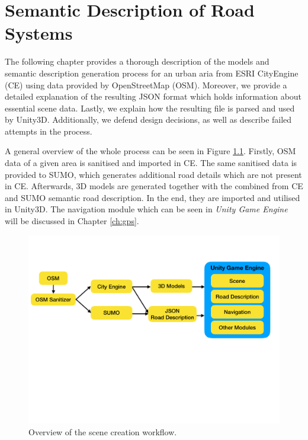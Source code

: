 \chapter{Semantic Description of Road Systems}
\label{ch:descriptionOfRoadSystems}
The following chapter provides a thorough description of the models and semantic description generation process for an urban aria from ESRI CityEngine (CE) using data provided by OpenStreetMap (OSM). Moreover, we provide a detailed explanation of the resulting JSON format which holds information about essential scene data. Lastly, we explain how the resulting file is parsed and used by Unity3D. Additionally, we defend design decisions, as well as describe failed attempts in the process.

A general overview of the whole process can be seen in Figure \ref{fig:overview}. Firstly, OSM data of a given area is sanitised and imported in CE. The same sanitised data is provided to SUMO, which generates additional road details which are not present in CE. Afterwards, 3D models are generated together with the combined from CE and SUMO semantic road description. In the end, they are imported and utilised in Unity3D. The navigation module which can be seen in \emph{Unity Game Engine} will be discussed in Chapter \ref{ch:gps}.

\begin{figure}[htb]
	\centering
	\includegraphics[width=0.95\linewidth]{figures/overview}
	\caption{Overview of the scene creation workflow.}
	\label{fig:overview}
\end{figure}

